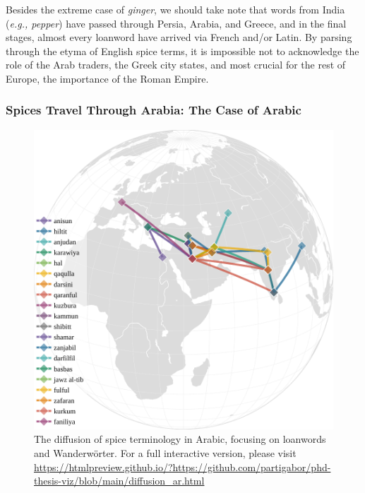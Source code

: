 

Besides the extreme case of \textit{ginger}, we should take note that words from India (\textit{e.g., pepper}) have passed through Persia, Arabia, and Greece, and in the final stages, almost every loanword have arrived via French and/or Latin. By parsing through the etyma of English spice terms, it is impossible not to acknowledge the role of the Arab traders, the Greek city states, and most crucial for the rest of Europe, the importance of the Roman Empire.


\subsubsection{Spices Travel Through Arabia: The Case of Arabic}

\begin{figure}[ht!]
    \includegraphics[width=\linewidth]{imgs/plots/diffusion_ar.pdf}
    \caption[The diffusion of spice terminology in Arabic.]{The diffusion of spice terminology in Arabic, focusing on loanwords and Wanderwörter. For a full interactive version, please visit \url{https://htmlpreview.github.io/?https://github.com/partigabor/phd-thesis-viz/blob/main/diffusion_ar.html}}
    \label{fig:diffusion_ar}
\end{figure}

